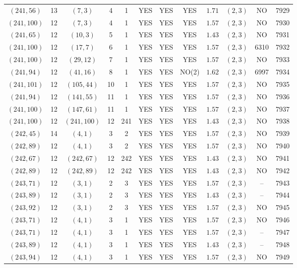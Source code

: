 \begin{longtable}{|c|c|c|c|c|c|c|c|c|c|c|c|}
$(241,56)$ & 13 & $(7,3)$ & 4 & 1 & YES & YES & YES & $1.71$ & $(2,3)$ & NO & 7929\\
$(241,100)$ & 12 & $(7,3)$ & 4 & 1 & YES & YES & YES & $1.57$ & $(2,3)$ & NO & 7930\\
$(241,65)$ & 12 & $(10,3)$ & 5 & 1 & YES & YES & YES & $1.43$ & $(2,3)$ & NO & 7931\\
$(241,100)$ & 12 & $(17,7)$ & 6 & 1 & YES & YES & YES & $1.57$ & $(2,3)$ & 6310 & 7932\\
$(241,100)$ & 12 & $(29,12)$ & 7 & 1 & YES & YES & YES & $1.57$ & $(2,3)$ & NO & 7933\\
$(241,94)$ & 12 & $(41,16)$ & 8 & 1 & YES & YES & NO(2) & $1.62$ & $(2,3)$ & 6997 & 7934\\
$(241,101)$ & 12 & $(105,44)$ & 10 & 1 & YES & YES & YES & $1.57$ & $(2,3)$ & NO & 7935\\
$(241,94)$ & 12 & $(141,55)$ & 11 & 1 & YES & YES & YES & $1.57$ & $(2,3)$ & NO & 7936\\
$(241,100)$ & 12 & $(147,61)$ & 11 & 1 & YES & YES & YES & $1.57$ & $(2,3)$ & NO & 7937\\
$(241,100)$ & 12 & $(241,100)$ & 12 & 241 & YES & YES & YES & $1.43$ & $(2,3)$ & NO & 7938\\
$(242,45)$ & 14 & $(4,1)$ & 3 & 2 & YES & YES & YES & $1.57$ & $(2,3)$ & NO & 7939\\
$(242,89)$ & 12 & $(4,1)$ & 3 & 2 & YES & YES & YES & $1.57$ & $(2,3)$ & NO & 7940\\
$(242,67)$ & 12 & $(242,67)$ & 12 & 242 & YES & YES & YES & $1.43$ & $(2,3)$ & NO & 7941\\
$(242,89)$ & 12 & $(242,89)$ & 12 & 242 & YES & YES & YES & $1.43$ & $(2,3)$ & NO & 7942\\
$(243,71)$ & 12 & $(3,1)$ & 2 & 3 & YES & YES & YES & $1.57$ & $(2,3)$ & -- & 7943\\
$(243,89)$ & 12 & $(3,1)$ & 2 & 3 & YES & YES & YES & $1.43$ & $(2,3)$ & -- & 7944\\
$(243,92)$ & 12 & $(3,1)$ & 2 & 3 & YES & YES & YES & $1.57$ & $(2,3)$ & NO & 7945\\
$(243,71)$ & 12 & $(4,1)$ & 3 & 1 & YES & YES & YES & $1.57$ & $(2,3)$ & NO & 7946\\
$(243,71)$ & 12 & $(4,1)$ & 3 & 1 & YES & YES & YES & $1.57$ & $(2,3)$ & -- & 7947\\
$(243,89)$ & 12 & $(4,1)$ & 3 & 1 & YES & YES & YES & $1.43$ & $(2,3)$ & -- & 7948\\
$(243,94)$ & 12 & $(4,1)$ & 3 & 1 & YES & YES & YES & $1.57$ & $(2,3)$ & NO & 7949\\

\end{longtable}
